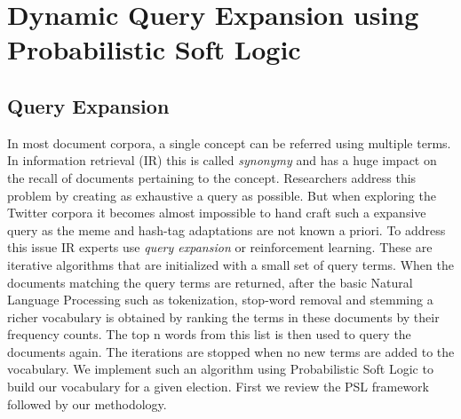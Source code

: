 \chapter{Dynamic Query Expansion using Probabilistic Soft Logic}
\section{Query Expansion}
In most document corpora, a single concept can be referred using multiple terms.
In information retrieval (IR) this is called \emph{synonymy} and has a huge impact on the recall of documents pertaining to the concept.
Researchers address this problem by creating as exhaustive a query as possible. 
But when exploring the Twitter corpora it becomes almost impossible to hand craft such a expansive query as the meme and hash-tag adaptations are not known a priori. 
\newline
To address this issue IR experts use \emph{query expansion} or reinforcement learning.
These are iterative algorithms that are initialized with a small set of query terms. 
When the documents matching the query terms are returned, after the basic Natural Language Processing such as tokenization, stop-word removal and stemming a richer vocabulary is obtained by ranking the terms in these documents by their frequency counts.
The top n words from this list is then used to query the documents again. 
The iterations are stopped when no new terms are added to the vocabulary. 
We implement such an algorithm using Probabilistic Soft Logic to build our vocabulary for a given election. 
First we review the PSL framework followed by our methodology.
